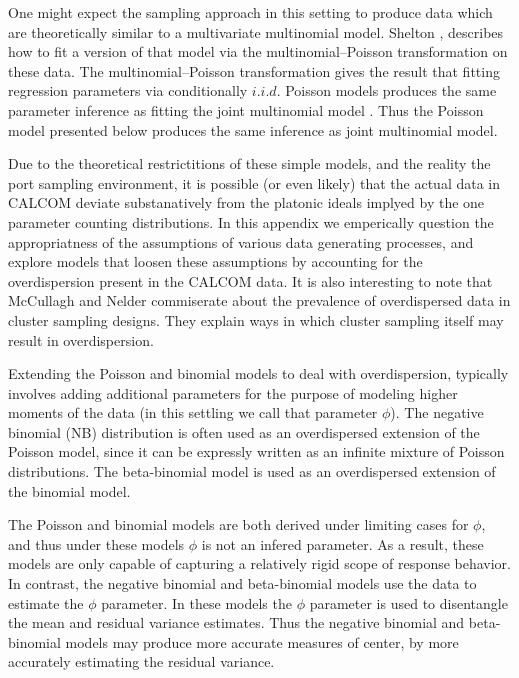 \documentclass[12pt]{article}
\begin{document}
%
One might expect the sampling approach in this setting to produce data which 
are theoretically similar to a multivariate multinomial model. Shelton 
\citeyear{shelton_estimating_2012}, describes how to fit a version of that 
model via the multinomial–Poisson transformation on these data. The 
multinomial–Poisson transformation gives the result that fitting regression 
parameters via conditionally $i.i.d.$ Poisson models produces the same 
parameter inference as fitting the joint multinomial model \cite{baker1994}.
Thus the Poisson model presented below produces the same inference as joint 
multinomial model. 

%
Due to the theoretical restrictitions of these simple models, and the reality 
the port sampling environment, it is possible (or even likely) that the actual 
data in CALCOM deviate substanatively from the platonic ideals implyed by the 
one parameter counting distributions. In this appendix we emperically question 
the appropriatness of the assumptions of various data generating processes, and 
explore models that loosen these assumptions by accounting for the overdispersion 
present in the CALCOM data. It is also interesting to note that McCullagh and Nelder 
\citeyear{nelder_generalized_1989} %
commiserate about the prevalence of overdispersed data in cluster sampling designs. 
They explain ways in which cluster sampling itself may result in overdispersion.
  
%
Extending the Poisson and binomial models to deal with overdispersion, 
typically involves adding additional parameters for the purpose of modeling 
higher moments of the data (in this settling we call that parameter $\phi$). 
The negative binomial (NB) distribution is often used as an overdispersed 
extension of the Poisson model, since it can be expressly written as an 
infinite mixture of Poisson distributions. The beta-binomial model is used as 
an overdispersed extension of the binomial model.  

The Poisson and binomial models are both derived under limiting cases for 
$\phi$, and thus under these models $\phi$ is not an infered parameter. 
As a result, these models are only capable of capturing a relatively rigid 
scope of response behavior. In contrast, the negative binomial and 
beta-binomial models use the data to estimate the $\phi$ parameter. In these 
models the $\phi$ parameter is used to disentangle the mean and residual 
variance estimates. Thus the negative binomial and beta-binomial models may 
produce more accurate measures of center, by more accurately estimating
the residual variance. %
\end{document}

